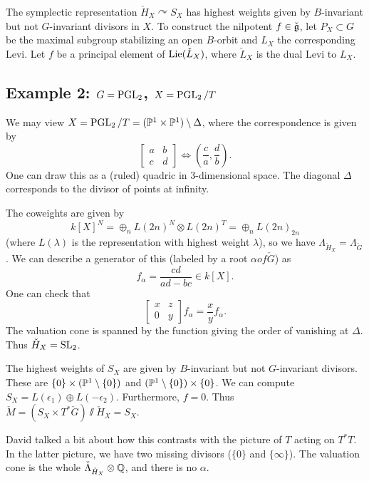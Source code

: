 \documentclass{article}
\begin{document}
The symplectic representation $\check{H}_X \curvearrowright S_X$ has highest weights given by $B$-invariant but not $G$-invariant divisors in $X$.
To construct the nilpotent $f \in \check{\mathfrak{g}}$, let $P_X \subset G$ be the maximal subgroup stabilizing an open $B$-orbit and $L_X$ the corresponding Levi.
Let $f$ be a principal element of $\operatorname{Lie}(\check{L}_X)$, where $\check{L}_X$ is the dual Levi to $L_X$.

\subsection{Example 2: $G = \operatorname{PGL}_2$, $X = \operatorname{PGL}_2 / T$}

We may view $X = \operatorname{PGL}_2 / T = (\mathbb{P}^1 \times \mathbb{P}^1) \setminus \Delta$, where the correspondence is given by
\[
	\begin{bmatrix}
		a & b \\
		c & d
	\end{bmatrix} \Leftrightarrow \left(\frac{c}{a}, \frac{d}{b}\right).
\]
One can draw this as a (ruled) quadric in $3$-dimensional space.
The diagonal $\Delta$ corresponds to the divisor of points at infinity.

The coweights are given by
\[
	k[X]^N = \oplus_n L(2n)^N \otimes L(2n)^T = \oplus_n L(2n)_{2n}
\]
(where $L(\lambda)$ is the representation with highest weight $\lambda$), so we have $\Lambda_{\check{H}_X} = \Lambda_{\check{G}}$.
We can describe a generator of this (labeled by a root $\alpha of \check{G}$) as
\[
	f_\alpha = \frac{cd}{ad - bc} \in k[X].
\]
One can check that
\[
	\begin{bmatrix}
		x & z \\
		0 & y
	\end{bmatrix} f_\alpha = \frac{x}{y} f_\alpha.
\]
The valuation cone is spanned by the function giving the order of vanishing at $\Delta$.
Thus $\check{H}_X = \operatorname{SL}_2$.

The highest weights of $S_X$ are given by $B$-invariant but not $G$-invariant divisors.
These are $\{0\} \times (\mathbb{P}^1 \setminus \{0\})$ and $(\mathbb{P}^1 \setminus \{0\}) \times \{0\}$.
We can compute $S_X = L(\epsilon_1) \oplus L(-\epsilon_2)$.
Furthermore, $f = 0$.
Thus $\check{M} = (S_X \times T^* \check{G}) \sslash \check{H}_X = S_X$.

David talked a bit about how this contrasts with the picture of $T$ acting on $T^*T$.
In the latter picture, we have two missing divisors ($\{0\}$ and $\{\infty\}$).
The valuation cone is the whole $\check{\Lambda}_{\check{H}_X} \otimes \mathbb{Q}$, and there is no $\alpha$.
\end{document}
